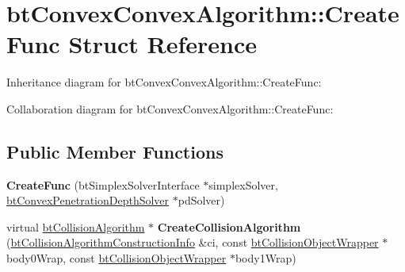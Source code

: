 \hypertarget{structbt_convex_convex_algorithm_1_1_create_func}{\section{bt\+Convex\+Convex\+Algorithm\+:\+:Create\+Func Struct Reference}
\label{structbt_convex_convex_algorithm_1_1_create_func}
}


Inheritance diagram for bt\+Convex\+Convex\+Algorithm\+:\+:Create\+Func\+:


Collaboration diagram for bt\+Convex\+Convex\+Algorithm\+:\+:Create\+Func\+:
\subsection*{Public Member Functions}
\begin{DoxyCompactItemize}
\item 
\hypertarget{structbt_convex_convex_algorithm_1_1_create_func_af47e5750bd8ef904b04fe59a55cb3c71}{{\bfseries Create\+Func} (bt\+Simplex\+Solver\+Interface $\ast$simplex\+Solver, \hyperlink{classbt_convex_penetration_depth_solver}{bt\+Convex\+Penetration\+Depth\+Solver} $\ast$pd\+Solver)}\label{structbt_convex_convex_algorithm_1_1_create_func_af47e5750bd8ef904b04fe59a55cb3c71}

\item 
\hypertarget{structbt_convex_convex_algorithm_1_1_create_func_a57dfa6b4924a2314ed9d72e732dde22c}{virtual \hyperlink{classbt_collision_algorithm}{bt\+Collision\+Algorithm} $\ast$ {\bfseries Create\+Collision\+Algorithm} (\hyperlink{structbt_collision_algorithm_construction_info}{bt\+Collision\+Algorithm\+Construction\+Info} \&ci, const \hyperlink{structbt_collision_object_wrapper}{bt\+Collision\+Object\+Wrapper} $\ast$body0\+Wrap, const \hyperlink{structbt_collision_object_wrapper}{bt\+Collision\+Object\+Wrapper} $\ast$body1\+Wrap)}\label{structbt_convex_convex_algorithm_1_1_create_func_a57dfa6b4924a2314ed9d72e732dde22c}

\end{DoxyCompactItemize}
